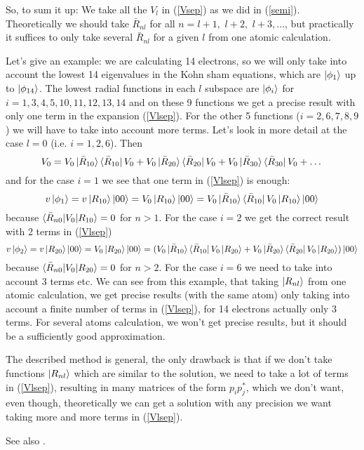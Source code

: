 So, to sum it up: We take all the $V_l$ in (\ref{Vsep}) as we did in (\ref{semi}). Theoretically we should take $\bar R_{nl}$ for all $n=l+1,\,\, l+2,\,\,l+3,\dots$, but practically it suffices to only take several $\bar R_{nl}$ for a given $l$ from one atomic calculation.

Let's give an example: we are calculating 14 electrons, so we will only take into account the lowest 14 eigenvalues in the Kohn sham equations, which are $\mathinner{|{\phi_1}\rangle}$ up to $\mathinner{|{\phi_{14}}\rangle}$. The lowest radial functions in each $l$ subspace are $\mathinner{|{\phi_i}\rangle}$ for $i=1,3,4,5,10,11,12,13,14$ and on these 9 functions we get a precise result with only one term in the expansion (\ref{Vlsep}). For the other 5 functions ($i=2,6,7,8,9$) we will have to take into account more terms. Let's look in more detail at the case $l=0$ (i.e. $i=1,2,6$). Then 
\begin{equation*}
  V_0= V_0\mathinner{|{\bar R_{10}}\rangle}\mathinner{\langle{\bar R_{10}}|}V_0+ V_0\mathinner{|{\bar R_{20}}\rangle}\mathinner{\langle{\bar R_{20}}|}V_0+ V_0\mathinner{|{\bar R_{30}}\rangle}\mathinner{\langle{\bar R_{30}}|}V_0+ \dots
\end{equation*}
and for the case $i=1$ we see that one term in (\ref{Vlsep}) is enough: 
\begin{equation*}
  v\mathinner{|{\phi_1}\rangle}=v\mathinner{|{R_{10}}\rangle}\mathinner{|{00}\rangle}=V_0\mathinner{|{R_{10}}\rangle}\mathinner{|{00}\rangle}= V_0\mathinner{|{\bar R_{10}}\rangle}\mathinner{\langle{\bar R_{10}}|}V_0\mathinner{|{R_{10}}\rangle}\mathinner{|{00}\rangle}
\end{equation*}
because $\mathinner{\langle{\bar R_{n0}|V_0|R_{10}}\rangle}=0$ for $n>1$. For the case $i=2$ we get the correct result with 2 terms in (\ref{Vlsep})
\begin{equation*}
  v\mathinner{|{\phi_2}\rangle}=v\mathinner{|{R_{20}}\rangle}\mathinner{|{00}\rangle}=V_0\mathinner{|{R_{20}}\rangle}\mathinner{|{00}\rangle}=( V_0\mathinner{|{\bar R_{10}}\rangle}\mathinner{\langle{\bar R_{10}}|}V_0\mathinner{|{R_{20}}\rangle}+ V_0\mathinner{|{\bar R_{20}}\rangle}\mathinner{\langle{\bar R_{20}}|}V_0\mathinner{|{R_{20}}\rangle} )\mathinner{|{00}\rangle}
\end{equation*}
because $\mathinner{\langle{\bar R_{n0}|V_0|R_{20}}\rangle}=0$ for $n>2$. For the case $i=6$ we need to take into account 3 terms etc. We can see from this example, that taking $\mathinner{|{R_{nl}}\rangle}$ from one atomic calculation, we get precise results (with the same atom) only taking into account a finite number of terms in (\ref{Vlsep}), for 14 electrons actually only 3 terms. For several atoms calculation, we won't get precise results, but it should be a sufficiently good approximation.

The described method is general, the only drawback is that if we don't take functions $\mathinner{|{R_{nl}}\rangle}$ which are similar to the solution, we need to take a lot of terms in (\ref{Vlsep}), resulting in many matrices of the form $p_ip_j^*$, which we don't want, even though, theoretically we can get a solution with any precision we want taking more and more terms in (\ref{Vlsep}).

See also \cite{blochl}.
